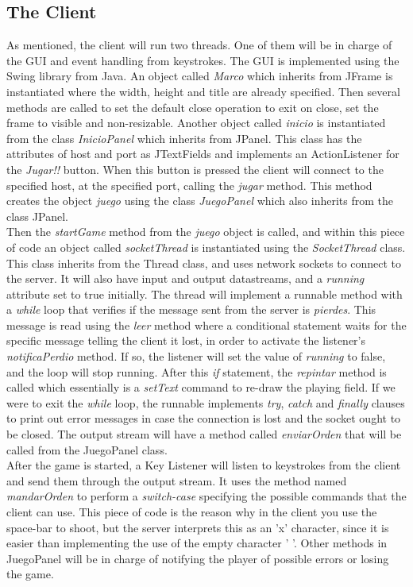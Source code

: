 \documentclass[10pt,a4paper]{article}
\theoremstyle{definition}
\begin{document}
\subsection{The Client}
As mentioned, the client will run two threads. 
One of them will be in charge of the GUI and event handling from keystrokes. 
The GUI is implemented using the Swing library from Java. 
An object called \textit{Marco} which inherits from JFrame is instantiated where the width, height and title are already specified. 
Then several methods are called to set the default close operation to exit on close, set the frame to visible and non-resizable.
Another object called \textit{inicio} is instantiated from the class \textit{InicioPanel} which inherits from JPanel. 
This class has the attributes of host and port as JTextFields and implements an ActionListener for the \textit{Jugar!!} button. 
When this button is pressed the client will connect to the specified host, at the specified port, calling the \textit{jugar} method. 
This method creates the object \textit{juego} using the class \textit{JuegoPanel} which also inherits from the class JPanel. \\
Then the \textit{startGame} method from the \textit{juego} object is called, and within this piece of code an object called \textit{socketThread} is instantiated using the \textit{SocketThread} class. 
This class inherits from the Thread class, and uses network sockets to connect to the server. 
It will also have input and output datastreams, and a \textit{running} attribute set to true initially. 
The thread will implement a runnable method with a \textit{while} loop that verifies if the message sent from the server is \textit{pierdes}. 
This message is read using the \textit{leer} method where a conditional statement waits for the specific message telling the client it lost, in order to activate the listener's \textit{notificaPerdio} method. 
If so, the listener will set the value of \textit{running} to false, and the loop will stop running.
After this \textit{if} statement, the \textit{repintar} method is called which essentially is a \textit{setText} command to re-draw the playing field. 
If we were to exit the \textit{while} loop, the runnable implements \textit{try}, \textit{catch} and \textit{finally} clauses to print out error messages in case the connection is lost and the socket ought to be closed. 
The output stream will have a method called \textit{enviarOrden} that will be called from the JuegoPanel class.\\
After the game is started, a Key Listener will listen to keystrokes from the client and send them through the output stream. It uses the method named \textit{mandarOrden} to perform a \textit{switch-case} specifying the possible commands that the client can use. 
This piece of code is the reason why in the client you use the space-bar to shoot, but the server interprets this as an 'x' character, since it is easier than implementing the use of the empty character ' '. 
Other methods in JuegoPanel will be in charge of notifying the player of possible errors or losing the game.
\end{document}
